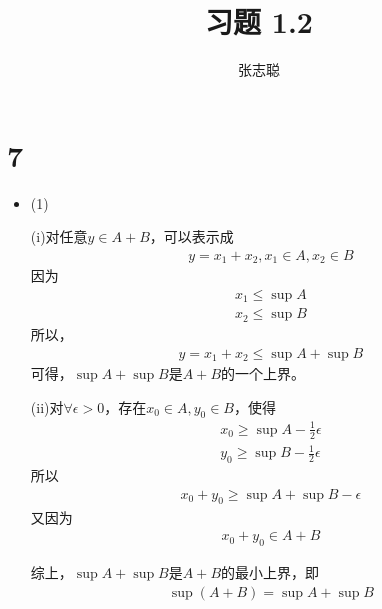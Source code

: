 \documentclass{article}
\begin{document}
\title{习题 1.2}
\author{张志聪}
\maketitle

\section*{7}

\begin{itemize}
  \item (1)

        (i)对任意$y \in A + B$，可以表示成
        \begin{align*}
          y = x_1 + x_2, x_1 \in A, x_2 \in B
        \end{align*}
        因为
        \begin{align*}
          x_1 \leq \sup A \\
          x_2 \leq \sup B
        \end{align*}
        所以，
        \begin{align*}
          y = x_1 + x_2 \leq \sup A + \sup B
        \end{align*}
        可得，$\sup A + \sup B$是$A + B$的一个上界。

        (ii)对$\forall \epsilon > 0$，存在$x_0 \in A, y_0 \in B$，使得
        \begin{align*}
          x_0 \geq \sup A - \frac{1}{2}\epsilon \\
          y_0 \geq \sup B - \frac{1}{2}\epsilon
        \end{align*}
        所以
        \begin{align*}
          x_0 + y_0 \geq \sup A + \sup B - \epsilon
        \end{align*}
        又因为
        \begin{align*}
          x_0 + y_0 \in A + B
        \end{align*}

        综上，$\sup A + \sup B$是$A + B$的最小上界，即
        \begin{align*}
          \sup (A + B) = \sup A + \sup B
        \end{align*}

\end{itemize}
\end{document}
